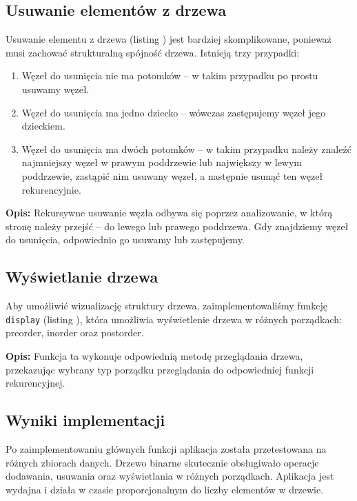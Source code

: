 \subsection{Usuwanie elementów z drzewa}

Usuwanie elementu z drzewa (listing ) jest bardziej skomplikowane, ponieważ musi zachować strukturalną spójność drzewa. Istnieją trzy przypadki:

\begin{enumerate}
	\item Węzeł do usunięcia nie ma potomków – w takim przypadku po prostu usuwamy węzeł.
	\item Węzeł do usunięcia ma jedno dziecko – wówczas zastępujemy węzeł jego dzieckiem.
	\item Węzeł do usunięcia ma dwóch potomków – w takim przypadku należy znaleźć najmniejszy węzeł w prawym poddrzewie lub największy w lewym poddrzewie, zastąpić nim usuwany węzeł, a następnie usunąć ten węzeł rekurencyjnie.
\end{enumerate}



\textbf{Opis:} Rekursywne usuwanie węzła odbywa się poprzez analizowanie, w którą stronę należy przejść – do lewego lub prawego poddrzewa. Gdy znajdziemy węzeł do usunięcia, odpowiednio go usuwamy lub zastępujemy.

\subsection{Wyświetlanie drzewa}

Aby umożliwić wizualizację struktury drzewa, zaimplementowaliśmy funkcję \texttt{display} (listing ), która umożliwia wyświetlenie drzewa w różnych porządkach: preorder, inorder oraz postorder.



\textbf{Opis:} Funkcja ta wykonuje odpowiednią metodę przeglądania drzewa, przekazując wybrany typ porządku przeglądania do odpowiedniej funkcji rekurencyjnej.

\subsection{Wyniki implementacji}

Po zaimplementowaniu głównych funkcji aplikacja została przetestowana na różnych zbiorach danych. Drzewo binarne skutecznie obsługiwało operacje dodawania, usuwania oraz wyświetlania w różnych porządkach. Aplikacja jest wydajna i działa w czasie proporcjonalnym do liczby elementów w drzewie.

